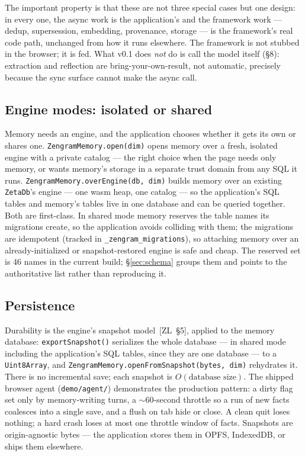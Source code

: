 \documentclass[11pt]{article}
\newcommand{\code}[1]{\texttt{#1}}
\begin{document}
The important property is that these are not three special cases but one design:
in every one, the async work is the application's and the framework work --- dedup,
supersession, embedding, provenance, storage --- is the framework's real code path,
unchanged from how it runs elsewhere. The framework is not stubbed in the browser;
it is fed. What v0.1 does \emph{not} do is call the model itself (\S8): extraction
and reflection are bring-your-own-result, not automatic, precisely because the
sync surface cannot make the async call.

\subsection{Engine modes: isolated or shared}

Memory needs an engine, and the application chooses whether it gets its own or
shares one. \code{ZengramMemory.open(dim)} opens memory over a fresh, isolated
engine with a private catalog --- the right choice when the page needs only
memory, or wants memory's storage in a separate trust domain from any SQL it runs.
\code{ZengramMemory.overEngine(db, dim)} builds memory over an existing
\code{ZetaDb}'s engine --- one wasm heap, one catalog --- so the application's SQL
tables and memory's tables live in one database and can be queried together. Both
are first-class. In shared mode memory reserves the table names its migrations
create, so the application avoids colliding with them; the migrations are
idempotent (tracked in \code{\_zengram\_migrations}), so attaching memory over an
already-initialized or snapshot-restored engine is safe and cheap. The reserved set
is 46 names in the current build; \S\ref{sec:schema} groups them and points to the
authoritative list rather than reproducing it.

\subsection{Persistence}

Durability is the engine's snapshot model~[ZL~\S5], applied to the memory database:
\code{exportSnapshot()} serializes the whole database --- in shared mode including
the application's SQL tables, since they are one database --- to a
\code{Uint8Array}, and \code{ZengramMemory.openFromSnapshot(bytes, dim)} rehydrates
it. There is no incremental save; each snapshot is $O(\text{database size})$. The
shipped browser agent (\code{demo/agent/}) demonstrates the production pattern: a
dirty flag set only by memory-writing turns, a $\sim$60-second throttle so a run of
new facts coalesces into a single save, and a flush on tab hide or close. A clean
quit loses nothing; a hard crash loses at most one throttle window of facts.
Snapshots are origin-agnostic bytes --- the application stores them in OPFS,
IndexedDB, or ships them elsewhere.
\end{document}
